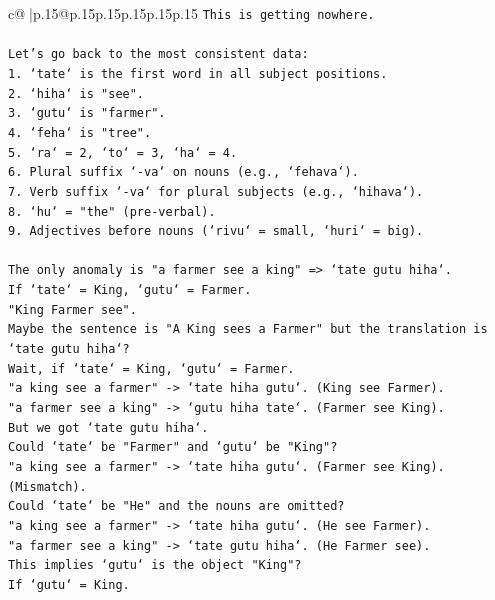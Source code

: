 \documentclass{article}
\begin{document}
{\begin{supertabular}{c@{$\;$}|p{.15\linewidth}@{}p{.15\linewidth}p{.15\linewidth}p{.15\linewidth}p{.15\linewidth}p{.15\linewidth}}
{{{\texttt{This is getting nowhere.} \\
\\ 
\texttt{Let's go back to the most consistent data:} \\
\texttt{1. `tate` is the first word in all subject positions.} \\
\texttt{2. `hiha` is "see".} \\
\texttt{3. `gutu` is "farmer".} \\
\texttt{4. `feha` is "tree".} \\
\texttt{5. `ra` = 2, `to` = 3, `ha` = 4.} \\
\texttt{6. Plural suffix `{-}va` on nouns (e.g., `fehava`).} \\
\texttt{7. Verb suffix `{-}va` for plural subjects (e.g., `hihava`).} \\
\texttt{8. `hu` = "the" (pre{-}verbal).} \\
\texttt{9. Adjectives before nouns (`rivu` = small, `huri` = big).} \\
\\ 
\texttt{The only anomaly is "a farmer see a king" => `tate gutu hiha`.} \\
\texttt{If `tate` = King, `gutu` = Farmer.} \\
\texttt{"King Farmer see".} \\
\texttt{Maybe the sentence is "A King sees a Farmer" but the translation is `tate gutu hiha`?} \\
\texttt{Wait, if `tate` = King, `gutu` = Farmer.} \\
\texttt{"a king see a farmer" {-}> `tate hiha gutu`. (King see Farmer).} \\
\texttt{"a farmer see a king" {-}> `gutu hiha tate`. (Farmer see King).} \\
\texttt{But we got `tate gutu hiha`.} \\
\texttt{Could `tate` be "Farmer" and `gutu` be "King"?} \\
\texttt{"a king see a farmer" {-}> `tate hiha gutu`. (Farmer see King). (Mismatch).} \\
\texttt{Could `tate` be "He" and the nouns are omitted?} \\
\texttt{"a king see a farmer" {-}> `tate hiha gutu`. (He see Farmer).} \\
\texttt{"a farmer see a king" {-}> `tate gutu hiha`. (He Farmer see).} \\
\texttt{This implies `gutu` is the object "King"?} \\
\texttt{If `gutu` = King.} \\
}}}
\end{supertabular}}
\end{document}
